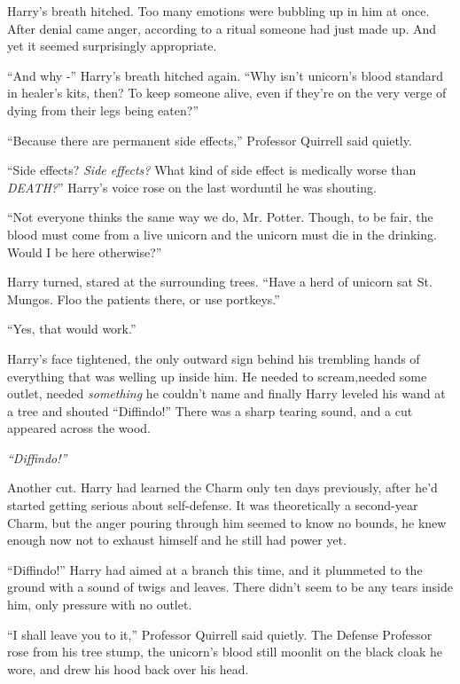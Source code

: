 Harry's breath hitched. Too many emotions were bubbling up in him at once. After denial came anger, according to a ritual someone had just made up. And yet it seemed surprisingly appropriate.

``And why -'' Harry's breath hitched again. ``Why isn't unicorn's blood standard in healer's kits, then? To keep someone alive, even if they're on the very verge of dying from their legs being eaten?''

``Because there are permanent side effects,'' Professor Quirrell said quietly.

``Side effects? \emph{Side effects?} What kind of side effect is medically worse than \emph{DEATH?}'' Harry's voice rose on the last worduntil he was shouting.

``Not everyone thinks the same way we do, Mr. Potter. Though, to be fair, the blood must come from a live unicorn and the unicorn must die in the drinking. Would I be here otherwise?''

Harry turned, stared at the surrounding trees. ``Have a herd of unicorn sat St. Mungos. Floo the patients there, or use portkeys.''

``Yes, that would work.''

Harry's face tightened, the only outward sign behind his trembling hands of everything that was welling up inside him. He needed to scream,needed some outlet, needed \emph{something} he couldn't name and finally Harry leveled his wand at a tree and shouted ``Diffindo!''
There was a sharp tearing sound, and a cut appeared across the wood.

\emph{``Diffindo!''}

Another cut. Harry had learned the Charm only ten days previously, after he'd started getting serious about self-defense. It was theoretically a second-year Charm, but the anger pouring through him seemed to know no bounds, he knew enough now not to exhaust himself and he still had power yet.

``Diffindo!'' Harry had aimed at a branch this time, and it plummeted to the ground with a sound of twigs and leaves.
There didn't seem to be any tears inside him, only pressure with no outlet.

``I shall leave you to it,'' Professor Quirrell said quietly. The Defense Professor rose from his tree stump, the unicorn's blood still moonlit on the black cloak he wore, and drew his hood back over his head.